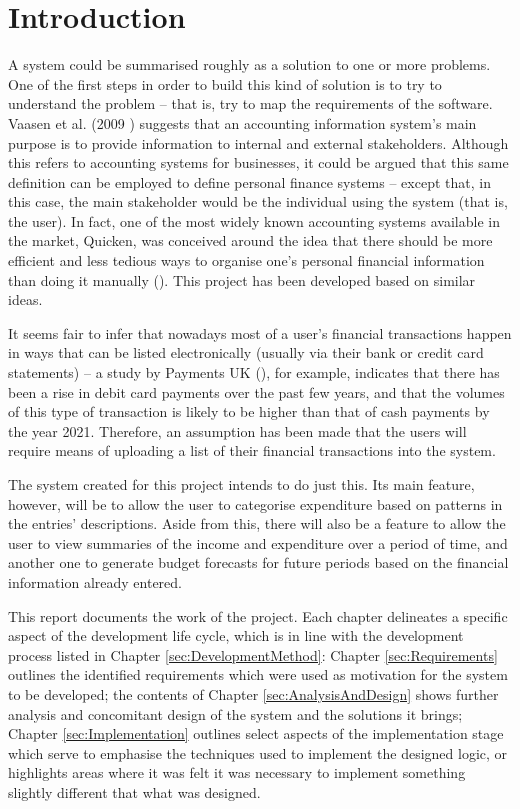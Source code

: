 \section{Introduction} \label{sec:Introduction}

A system could be summarised roughly as a solution to one or more problems. One
of the first steps in order to build this kind of solution is to try to
understand the problem -- that is, try to map the requirements of the software.
Vaasen et al. (2009 \cite[cited][p.~8]{Boczko:2012:IAI:2331376}) suggests that
an accounting information system's main purpose is to provide information to
internal and external stakeholders. Although this refers to accounting systems
for businesses, it could be argued that this same definition can be employed to
define personal finance systems -- except that, in this case, the main
stakeholder would be the individual using the system (that is, the user). In
fact, one of the most widely known accounting systems available in the market,
Quicken\texttrademark, was conceived around the idea that there should be more
efficient and less tedious ways to organise one's personal financial
information than doing it manually (\cite{quicken2017about}). This project has
been developed based on similar ideas.

It seems fair to infer that nowadays most of a user's financial transactions
happen in ways that can be listed electronically (usually via their bank or
credit card statements) -- a study by Payments UK
(\citeyear{paymentsUK2017summary}), for example, indicates that there has been
a rise in debit card payments over the past few years, and that the volumes of
this type of transaction is likely to be higher than that of cash payments by
the year 2021. Therefore, an assumption has been made that the users will
require means of uploading a list of their financial transactions into the
system.

The system created for this project intends to do just this. Its main feature,
however, will be to allow the user to categorise expenditure based on patterns
in the entries' descriptions. Aside from this, there will also be a feature to
allow the user to view summaries of the income and expenditure over a period of
time, and another one to generate budget forecasts for future periods based on
the financial information already entered.

This report documents the work of the project. Each chapter delineates a
specific aspect of the development life cycle, which is in line with the
development process listed in Chapter \ref{sec:DevelopmentMethod}: Chapter
\ref{sec:Requirements} outlines the identified requirements which were used as
motivation for the system to be developed; the contents of Chapter
\ref{sec:AnalysisAndDesign} shows further analysis and concomitant design of
the system and the solutions it brings; Chapter \ref{sec:Implementation}
outlines select aspects of the implementation stage which serve to emphasise
the techniques used to implement the designed logic, or highlights areas where
it was felt it was necessary to implement something slightly different that
what was designed.

